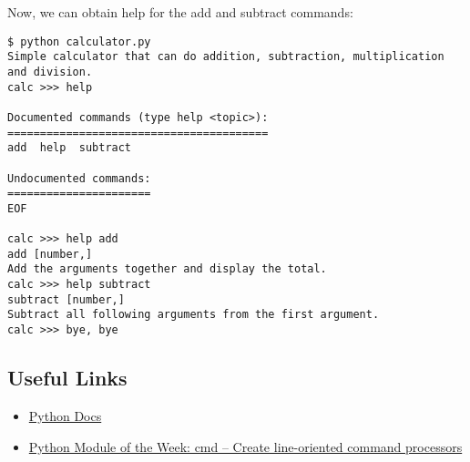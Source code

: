 Now, we can obtain help for the add and subtract commands:

\begin{lstlisting}
$ python calculator.py
Simple calculator that can do addition, subtraction, multiplication and division.
calc >>> help

Documented commands (type help <topic>):
========================================
add  help  subtract

Undocumented commands:
======================
EOF

calc >>> help add
add [number,]
Add the arguments together and display the total.
calc >>> help subtract
subtract [number,]
Subtract all following arguments from the first argument.
calc >>> bye, bye
\end{lstlisting}

\subsection{Useful Links}\label{useful-links}

\begin{itemize}

\item
  \href{https://docs.python.org/2/library/cmd.html}{Python Docs}
\item
  \href{https://pymotw.com/2/cmd/}{Python Module of the Week: cmd --
  Create line-oriented command processors}
\end{itemize}
